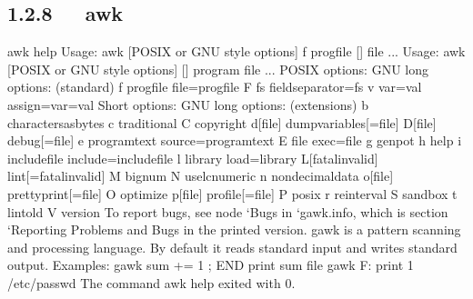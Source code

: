 \documentclass[letterpaper,12pt,english]{sphinxmanual}
\begin{document}
\subsection{1.2.8   awk}
\label{\detokenize{001software/001install/linux:awk}}
\begin{sphinxVerbatim}[commandchars=\\\{\}]
\PYGZdl{} awk \PYGZhy{}\PYGZhy{}help
Usage: awk [POSIX or GNU style options] \PYGZhy{}f progfile [\PYGZhy{}\PYGZhy{}] file ...
Usage: awk [POSIX or GNU style options] [\PYGZhy{}\PYGZhy{}] \PYGZsq{}program\PYGZsq{} file ...
POSIX options:    GNU long options: (standard)
  \PYGZhy{}f progfile   \PYGZhy{}\PYGZhy{}file=progfile
  \PYGZhy{}F fs     \PYGZhy{}\PYGZhy{}field\PYGZhy{}separator=fs
  \PYGZhy{}v var=val    \PYGZhy{}\PYGZhy{}assign=var=val
Short options:    GNU long options: (extensions)
  \PYGZhy{}b      \PYGZhy{}\PYGZhy{}characters\PYGZhy{}as\PYGZhy{}bytes
  \PYGZhy{}c      \PYGZhy{}\PYGZhy{}traditional
  \PYGZhy{}C      \PYGZhy{}\PYGZhy{}copyright
  \PYGZhy{}d[file]    \PYGZhy{}\PYGZhy{}dump\PYGZhy{}variables[=file]
  \PYGZhy{}D[file]    \PYGZhy{}\PYGZhy{}debug[=file]
  \PYGZhy{}e \PYGZsq{}program\PYGZhy{}text\PYGZsq{} \PYGZhy{}\PYGZhy{}source=\PYGZsq{}program\PYGZhy{}text\PYGZsq{}
  \PYGZhy{}E file     \PYGZhy{}\PYGZhy{}exec=file
  \PYGZhy{}g      \PYGZhy{}\PYGZhy{}gen\PYGZhy{}pot
  \PYGZhy{}h      \PYGZhy{}\PYGZhy{}help
  \PYGZhy{}i includefile    \PYGZhy{}\PYGZhy{}include=includefile
  \PYGZhy{}l library    \PYGZhy{}\PYGZhy{}load=library
  \PYGZhy{}L[fatal\textbar{}invalid] \PYGZhy{}\PYGZhy{}lint[=fatal\textbar{}invalid]
  \PYGZhy{}M      \PYGZhy{}\PYGZhy{}bignum
  \PYGZhy{}N      \PYGZhy{}\PYGZhy{}use\PYGZhy{}lc\PYGZhy{}numeric
  \PYGZhy{}n      \PYGZhy{}\PYGZhy{}non\PYGZhy{}decimal\PYGZhy{}data
  \PYGZhy{}o[file]    \PYGZhy{}\PYGZhy{}pretty\PYGZhy{}print[=file]
  \PYGZhy{}O      \PYGZhy{}\PYGZhy{}optimize
  \PYGZhy{}p[file]    \PYGZhy{}\PYGZhy{}profile[=file]
  \PYGZhy{}P      \PYGZhy{}\PYGZhy{}posix
  \PYGZhy{}r      \PYGZhy{}\PYGZhy{}re\PYGZhy{}interval
  \PYGZhy{}S      \PYGZhy{}\PYGZhy{}sandbox
  \PYGZhy{}t      \PYGZhy{}\PYGZhy{}lint\PYGZhy{}old
  \PYGZhy{}V      \PYGZhy{}\PYGZhy{}version
To report bugs, see node {}`Bugs\PYGZsq{} in {}`gawk.info\PYGZsq{}, which is
section {}`Reporting Problems and Bugs\PYGZsq{} in the printed version.
gawk is a pattern scanning and processing language.
By default it reads standard input and writes standard output.
Examples:
  gawk \PYGZsq{}\PYGZob{} sum += \PYGZdl{}1 \PYGZcb{}; END \PYGZob{} print sum \PYGZcb{}\PYGZsq{} file
  gawk \PYGZhy{}F: \PYGZsq{}\PYGZob{} print \PYGZdl{}1 \PYGZcb{}\PYGZsq{} /etc/passwd
The command \PYGZdq{}awk \PYGZhy{}\PYGZhy{}help\PYGZdq{} exited with 0.
\end{sphinxVerbatim}
\end{document}
